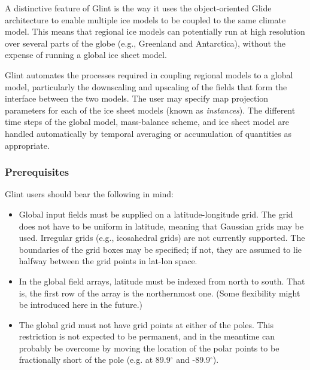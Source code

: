 A distinctive feature of Glint is the
way it uses the object-oriented Glide architecture to enable multiple ice
models to be coupled to the same climate model. This means that regional ice
models can potentially run at high resolution over several parts of the globe
(e.g., Greenland and Antarctica), without the expense of running a global ice sheet model.

Glint automates the processes required in coupling regional models to a global
model, particularly the downscaling and upscaling of the fields that form the
interface between the two models. The user may specify map projection
parameters for each of the ice sheet models (known as \emph{instances}).
The different time steps of the global model, mass-balance scheme, and ice sheet model are
handled automatically by temporal averaging or accumulation of quantities as
appropriate. 

%
%
\subsubsection{Prerequisites}
%
Glint users should bear the following in mind:
%
\begin{itemize}
\item Global input fields must be supplied on a latitude-longitude
  grid. The grid does not have to be uniform in latitude, meaning that
  Gaussian grids may be used. Irregular grids (e.g., icosahedral grids) are not
  currently supported. The boundaries of the grid boxes may be specified; if
  not, they are assumed to lie halfway between the grid points in lat-lon space.
\item In the global field arrays, latitude must be indexed from north to south.
  That is, the first row of the array is the northernmost one. (Some
  flexibility might be introduced here in the future.)
\item The global grid must not have grid points at either of the
  poles. This restriction is not expected to be permanent, and in the meantime
  can probably be overcome by moving the location of the polar points to be
  fractionally short of the pole (e.g. at 89.9$^{\circ}$ and -89.9$^{\circ}$).
\end{itemize}
%
